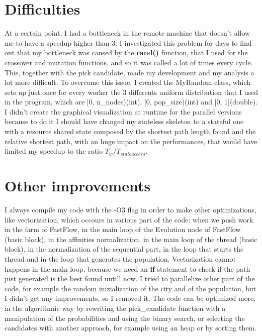 \documentclass{article}
\begin{document}
    \section{Difficulties}
	At a certain point, I had a bottleneck in the remote machine that doesn't allow me to have a speedup higher than 3. I investigated this problem for days to find out that my bottleneck was caused by the \textbf{rand()} function, that I used for the crossover and mutation functions, and so it was called a lot of times every cycle. This, together with the pick candidate, made my development and my analysis a lot more difficult. To overcome this issue, I created the MyRandom class, which sets up just once for every worker the 3 differents uniform distribution that I used in the program, which are [0, n\_nodes)(int), [0, pop\_size)(int) and [0, 1](double).
	I didn't create the graphical visualization at runtime for the parallel versions because to do it I should have changed my stateless skeleton to a stateful one with a resource shared state composed by the shortest path length found and the relative shortest path, with an huge impact on the performances, that would have limited my speedup to the ratio $T_{w}/T_{state access}$.

    \section{Other improvements}
	I always compile my code with the -O3 flag in order to make other optimizations, like vectorization, which occours in various part of the code: when we push work in the farm of FastFlow, in the main loop of the Evolution node of FastFlow (basic block), in the affinities normalization, in the main loop of the thread (basic block), in the normalization of the sequential part, in the loop that starts the thread and in the loop that generates the population. Vectorization cannot happens in the main loop, because we need an \textbf{if} statement to check if the path just generated is the best found untill now. I tried to parallelize other part of the code, for example the random inizialization of the city and of the population, but I didn't get any improvements, so I removed it. The code can be optimized more, in the algorithmic way by rewriting the pick\_candidate function with a manipulation of the probabilities and using the binary search, or selecting the candidates with another approach, for example using an heap or by sorting them.
\end{document}
